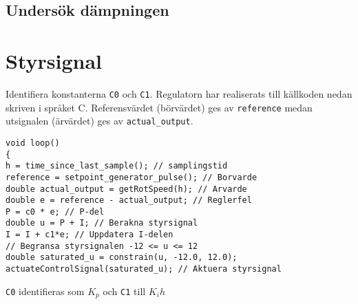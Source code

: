 \documentclass[11pt]{article}
\begin{document}
\subsection{Undersök dämpningen}
\section{Styrsignal}
Identifiera konstanterna \texttt{C0} och \texttt{C1}. Regulatorn har realiserats till källkoden nedan skriven i språket C. Referensvärdet (börvärdet) ges av \texttt{reference} medan utsignalen (ärvärdet) ges av \texttt{actual\_output}.

\begin{lstlisting}[frame=single]
void loop()
{
h = time_since_last_sample(); // samplingstid
reference = setpoint_generator_pulse(); // Borvarde
double actual_output = getRotSpeed(h); // Arvarde
double e = reference - actual_output; // Reglerfel
P = c0 * e; // P-del
double u = P + I; // Berakna styrsignal
I = I + c1*e; // Uppdatera I-delen
// Begransa styrsignalen -12 <= u <= 12
double saturated_u = constrain(u, -12.0, 12.0);
actuateControlSignal(saturated_u); // Aktuera styrsignal
\end{lstlisting} \vspace*{1em}

\texttt{C0} identifieras som $K_p$ och \texttt{C1} till $K_ih$
\end{document}
